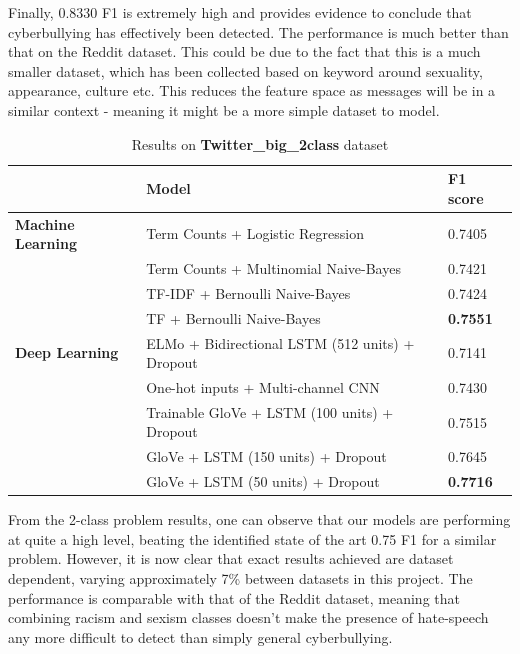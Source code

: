 \documentclass[12pt,a4paper]{article}
\begin{document}
Finally, 0.8330 F1 is extremely high and provides evidence to conclude that cyberbullying has effectively been detected. The performance is much better than that on the Reddit dataset. This could be due to the fact that this is a much smaller dataset, which has been collected based on keyword around sexuality, appearance, culture etc. This reduces the feature space as messages will be in a similar context - meaning it might be a more simple dataset to model.


\begin{table}[H]
	\centering
	\vspace*{-12pt}
	\caption{Results on \textbf{Twitter\_big\_2class} dataset}
	\label{results3}
	\hspace*{-0.8cm}
	\begin{tabular}{p{3.4cm} p{11cm} p{2cm}} \hline\hline
		& \textbf{Model} & \textbf{F1 score}  \\ \hline
		
		\textbf{Machine Learning} & Term Counts + Logistic Regression & 0.7405  \\
		& Term Counts + Multinomial Naive-Bayes & 0.7421  \\
		& TF-IDF + Bernoulli Naive-Bayes & 0.7424  \\
		& TF + Bernoulli Naive-Bayes & \textbf{0.7551} \\ \hline
		
		\textbf{Deep Learning} & ELMo + Bidirectional LSTM (512 units) + Dropout & 0.7141 \\
		&  One-hot inputs + Multi-channel CNN & 0.7430 \\
		&  Trainable GloVe + LSTM (100 units) + Dropout & 0.7515  \\  
		&  GloVe + LSTM (150 units) + Dropout & 0.7645  \\
		&  GloVe + LSTM (50 units) + Dropout & \textbf{0.7716} \\ \hline
	\end{tabular}
\end{table}

From the 2-class problem results, one can observe that our models are performing at quite a high level, beating the identified state of the art 0.75 F1 \cite{Hack} for a similar problem. However, it is now clear that exact results achieved are dataset dependent, varying approximately 7\% between datasets in this project. The performance is comparable with that of the Reddit dataset, meaning that combining racism and sexism classes doesn't make the presence of hate-speech any more difficult to detect than simply general cyberbullying.
\end{document}
